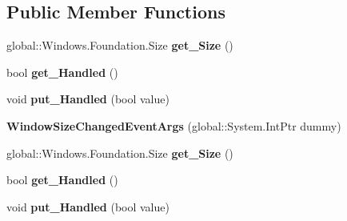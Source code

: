\subsection*{Public Member Functions}
\begin{DoxyCompactItemize}
\item 
\mbox{\label{class_windows_1_1_u_i_1_1_core_1_1_window_size_changed_event_args_adb9511c374eca59b6ea8bd3304b2d29a}} 
global\+::\+Windows.\+Foundation.\+Size {\bfseries get\+\_\+\+Size} ()
\item 
\mbox{\label{class_windows_1_1_u_i_1_1_core_1_1_window_size_changed_event_args_ad2ed5746ca6426f34799617fd09e7654}} 
bool {\bfseries get\+\_\+\+Handled} ()
\item 
\mbox{\label{class_windows_1_1_u_i_1_1_core_1_1_window_size_changed_event_args_a7a3ef8971cccc5897d36da53a0d08050}} 
void {\bfseries put\+\_\+\+Handled} (bool value)
\item 
\mbox{\label{class_windows_1_1_u_i_1_1_core_1_1_window_size_changed_event_args_ad2d367e9eae149917697992f05763f8e}} 
{\bfseries Window\+Size\+Changed\+Event\+Args} (global\+::\+System.\+Int\+Ptr dummy)
\item 
\mbox{\label{class_windows_1_1_u_i_1_1_core_1_1_window_size_changed_event_args_adb9511c374eca59b6ea8bd3304b2d29a}} 
global\+::\+Windows.\+Foundation.\+Size {\bfseries get\+\_\+\+Size} ()
\item 
\mbox{\label{class_windows_1_1_u_i_1_1_core_1_1_window_size_changed_event_args_ad2ed5746ca6426f34799617fd09e7654}} 
bool {\bfseries get\+\_\+\+Handled} ()
\item 
\mbox{\label{class_windows_1_1_u_i_1_1_core_1_1_window_size_changed_event_args_a7a3ef8971cccc5897d36da53a0d08050}} 
void {\bfseries put\+\_\+\+Handled} (bool value)

\end{DoxyCompactItemize}
